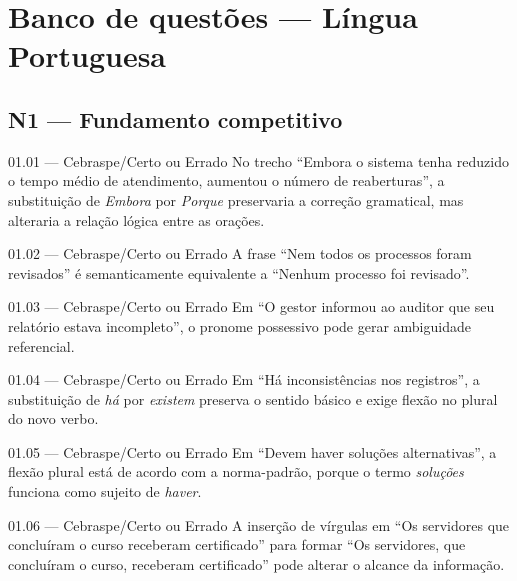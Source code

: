 \section{Banco de questões — Língua Portuguesa}

\subsection*{N1 — Fundamento competitivo}

\begin{questao}{ 01.01 — Cebraspe/Certo ou Errado}
No trecho ``Embora o sistema tenha reduzido o tempo médio de atendimento, aumentou o número de reaberturas'', a substituição de \emph{Embora} por \emph{Porque} preservaria a correção gramatical, mas alteraria a relação lógica entre as orações.
\end{questao}

\begin{questao}{ 01.02 — Cebraspe/Certo ou Errado}
A frase ``Nem todos os processos foram revisados'' é semanticamente equivalente a ``Nenhum processo foi revisado''.
\end{questao}

\begin{questao}{ 01.03 — Cebraspe/Certo ou Errado}
Em ``O gestor informou ao auditor que seu relatório estava incompleto'', o pronome possessivo pode gerar ambiguidade referencial.
\end{questao}

\begin{questao}{ 01.04 — Cebraspe/Certo ou Errado}
Em ``Há inconsistências nos registros'', a substituição de \emph{há} por \emph{existem} preserva o sentido básico e exige flexão no plural do novo verbo.
\end{questao}

\begin{questao}{ 01.05 — Cebraspe/Certo ou Errado}
Em ``Devem haver soluções alternativas'', a flexão plural está de acordo com a norma-padrão, porque o termo \emph{soluções} funciona como sujeito de \emph{haver}.
\end{questao}

\begin{questao}{ 01.06 — Cebraspe/Certo ou Errado}
A inserção de vírgulas em ``Os servidores que concluíram o curso receberam certificado'' para formar ``Os servidores, que concluíram o curso, receberam certificado'' pode alterar o alcance da informação.
\end{questao}


